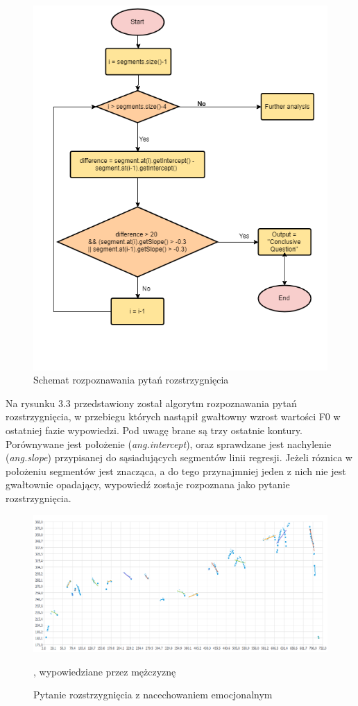 \documentclass[a4paper,12 pt]{report}
\begin{document}
\begin{figure}[h]
\centering
\includegraphics[scale=1.0]{conclusive.png}
\caption{Schemat rozpoznawania pytań rozstrzygnięcia}
\end{figure}
\FloatBarrier
Na rysunku 3.3 przedstawiony został algorytm rozpoznawania pytań rozstrzygnięcia, w przebiegu których nastąpił gwałtowny wzrost wartości F0 w ostatniej fazie wypowiedzi. Pod uwagę brane są trzy ostatnie kontury. Porównywane jest położenie  (\textit{ang.intercept}), oraz sprawdzane jest nachylenie (\textit{ang.slope}) przypisanej do sąsiadujących segmentów linii regresji. Jeżeli róznica w położeniu segmentów jest znacząca, a do tego przynajmniej jeden z nich nie jest gwałtownie opadający, wypowiedź zostaje rozpoznana jako pytanie rozstrzygnięcia.
  
\begin{figure}[h]
\centering
\includegraphics[scale=0.85]{pytanie_rozstrzygniecia_2_emocje.pdf}
\caption{Pytanie rozstrzygnięcia z nacechowaniem emocjonalnym}, wypowiedziane przez mężczyznę
\end{figure}
 
\end{document}
